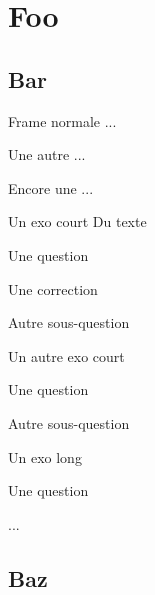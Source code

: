 \section{Foo}
\subsection{Bar}
\begin{frame}{Frame normale}
...
\end{frame}
\begin{frame}{Une autre}
...
\end{frame}
\begin{frame}{Encore une}
...
\end{frame}
\begin{exercice}
  \begin{exercicelet}{Un exo court}
    Du texte
    \begin{questions}
    \item Une question
      \begin{correction}
        Une correction
      \end{correction}
    \item Autre sous-question
    \end{questions}
  \end{exercicelet}
  \begin{exercicelet}{Un autre exo court}
    \begin{questions}
    \item Une question
    \item Autre sous-question
    \end{questions}
  \end{exercicelet}
\end{exercice}
\begin{exercice}
  \begin{exercicelet}{Un exo long}
    \begin{questions}
    \item Une question
    \item ...
    \end{questions}
  \end{exercicelet}
\end{exercice}
\subsection{Baz}

